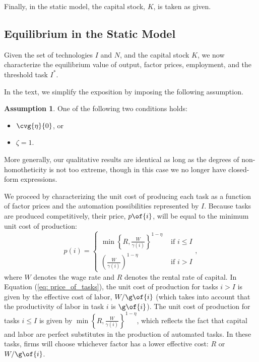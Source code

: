\documentclass[12pt]{article}
\newcommand{\highlightP}[1]{{\emph{\color{MyPink}{#1}}}}
\theoremstyle{definition}
\newtheorem{assumption}{Assumption}
\begin{document}
Finally, in the static model, the capital stock, $K$, is taken as given.

\subsection{Equilibrium in the Static Model}

Given the set of technologies $I$ and $N$, and the capital stock $K$, we now characterize the equilibrium value of output, factor prices, employment, and the threshold task $I^*$.

In the text, we simplify the exposition by imposing the following assumption.
\begin{assumption}
    \label{ass_2}
	One of the following two conditions holds:
	\begin{itemize}[topsep=0pt, leftmargin=30pt, itemsep=0pt]
		\setlength{\parskip}{10pt} 
		\item $\cvg{\eta}{0}$, or
		\item $\zeta = 1$.
	\end{itemize}
\end{assumption}

\highlightP{These two special cases ensure that the demand for labor and capital is homothetic.} More generally, our qualitative results are identical as long as the degrees of non-homotheticity is not too extreme, though in this case we no longer have closed-form expressions.

\highlightP{How can I derive this unit cost of production?}

We proceed by characterizing the unit cost of producing each task as a function of factor prices and the automation possibilities represented by $I$. Because tasks are produced competitively, their price, $p\of{i}$, will be equal to the minimum unit cost of production:
\begin{equation}
    \label{eq: price_of_tasks}
	p(i)=\left\{\begin{array}{ll}
		\min \left\{R, \frac{W}{\gamma(i)}\right\}^{1-\eta} & \text { if } i \leq I \\
		\left(\frac{W}{\gamma(i)}\right)^{1-\eta} & \text { if } i>I
	\end{array},\right.
\end{equation}
where $W$ denotes the wage rate and $R$ denotes the rental rate of capital. In Equation (\ref{eq: price_of_tasks}), the unit cost of production for tasks $i > I$ is given by the effective cost of labor, $W / \g\of{i}$ (which takes into account that the productivity of labor in task $i$ is $\g\of{i}$). The unit cost of production for tasks $i \leq I$ is given by $\min \left\{R, \frac{W}{\gamma(i)}\right\}^{1-\eta}$, which reflects the fact that capital and labor are perfect substitutes in the production of automated tasks. In these tasks, firms will choose whichever factor has a lower effective cost: $R$ or $W /\g\of{i}$.
\end{document}
